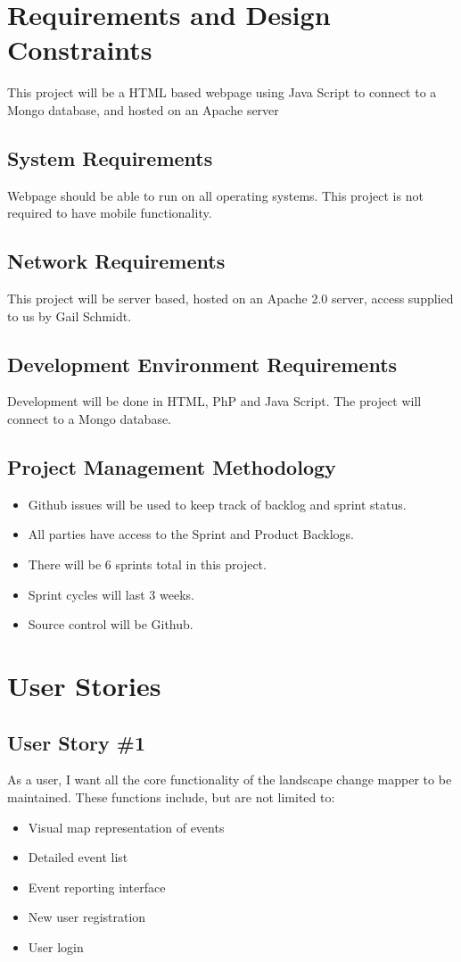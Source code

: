 \section{Requirements and Design Constraints}

This project will be a HTML based webpage using Java Script to connect to a Mongo database, and hosted on an Apache server

\subsection{System  Requirements}
Webpage should be able to run on all operating systems. This project is not required to have mobile functionality.


\subsection{Network Requirements}
This project will be server based, hosted on an Apache 2.0 server, access supplied to us by Gail Schmidt. 

\subsection{Development Environment Requirements}
Development will be done in HTML, PhP and Java Script. The project will connect to a Mongo database.

\subsection{Project  Management Methodology}
\begin{itemize}
\item Github issues will be used to keep track of backlog and sprint status.
\item All parties have access to the Sprint and Product Backlogs.
\item There will be 6 sprints total in this project.
\item Sprint cycles will last 3 weeks.
\item Source control will be Github.
\end{itemize}

\section{User Stories}

\subsection{User Story \#1}
As a user, I want all the core functionality of the landscape change mapper to be maintained. These functions include, but are not limited to:
\begin{itemize}
\item Visual map representation of events
\item Detailed event list
\item Event reporting interface
\item New user registration
\item User login
\end{itemize}

